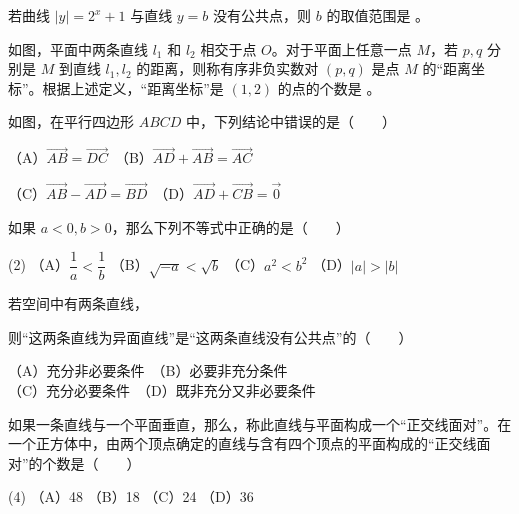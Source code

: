 \begin{question}
若曲线 $|y|=2^x+1$ 与直线 $y=b$ 没有公共点，则 $b$ 的取值范围是 \gkblank{}。

\Needspace{0.4\textheight}
\end{question}
\begin{question}
如图，平面中两条直线 $l_1$ 和 $l_2$ 相交于点 $O$。对于平面上任意一点 $M$，若 $p,q$ 分别是 $M$ 到直线 $l_1,l_2$ 的距离，则称有序非负实数对 $(p,q)$ 是点 $M$ 的“距离坐标”。根据上述定义，“距离坐标”是 $(1,2)$ 的点的个数是 \gkblank{}。
\nopagebreak[4]
\begin{center}\end{center}
\nopagebreak[4]
\end{question}

\Needspace{0.4\textheight}
\begin{question}
如图，在平行四边形 $ABCD$ 中，下列结论中错误的是\mbox{（　　）}

（A）$\overrightarrow{AB}=\overrightarrow{DC}$　（B）$\overrightarrow{AD}+\overrightarrow{AB}=\overrightarrow{AC}$

（C）$\overrightarrow{AB}-\overrightarrow{AD}=\overrightarrow{BD}$　（D）$\overrightarrow{AD}+\overrightarrow{CB}=\vec 0$
\nopagebreak[4]
\begin{center}\end{center}
\nopagebreak[4]
\end{question}
\begin{question}
如果 $a<0,b>0$，那么下列不等式中正确的是\mbox{（　　）}

\begin{gkopts}(2)
\task （A）$\dfrac1a<\dfrac1b$
\task （B）$\sqrt{-a}<\sqrt b$
\task （C）$a^2<b^2$
\task （D）$|a|>|b|$
\end{gkopts}

\end{question}
\begin{question}
若空间中有两条直线，

则“这两条直线为异面直线”是“这两条直线没有公共点”的\mbox{（　　）}

（A）充分非必要条件　（B）必要非充分条件\\
（C）充分必要条件　（D）既非充分又非必要条件

\end{question}
\begin{question}
如果一条直线与一个平面垂直，那么，称此直线与平面构成一个“正交线面对”。在一个正方体中，由两个顶点确定的直线与含有四个顶点的平面构成的“正交线面对”的个数是\mbox{（　　）}

\begin{gkopts}(4)
\task （A）48
\task （B）18
\task （C）24
\task （D）36
\end{gkopts}

\end{question}

